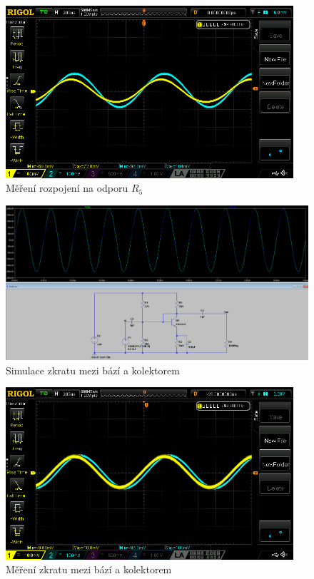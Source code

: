 \documentclass{article}
\begin{document}
\begin{figure}[H]
  \centering
  \includegraphics[width=0.95\textwidth]{mereni/NewFolder1/NewFile4.png}
  \caption{Měření rozpojení na odporu \(R_5\)}
  \label{fig:m-sch-se-p1}
\end{figure}


\begin{figure}[H]
  \centering
  \includegraphics[width=\textwidth]{sim/ukol1/porucha4.png}
  \caption{Simulace zkratu mezi bází a kolektorem}
  \label{fig:sch-se-p4}
\end{figure}

\begin{figure}[H]
  \centering
  \includegraphics[width=0.95\textwidth]{mereni/NewFolder1/NewFile5.png}
  \caption{Měření zkratu mezi bází a kolektorem}
  \label{fig:m-sch-se-p1}
\end{figure}
\end{document}
